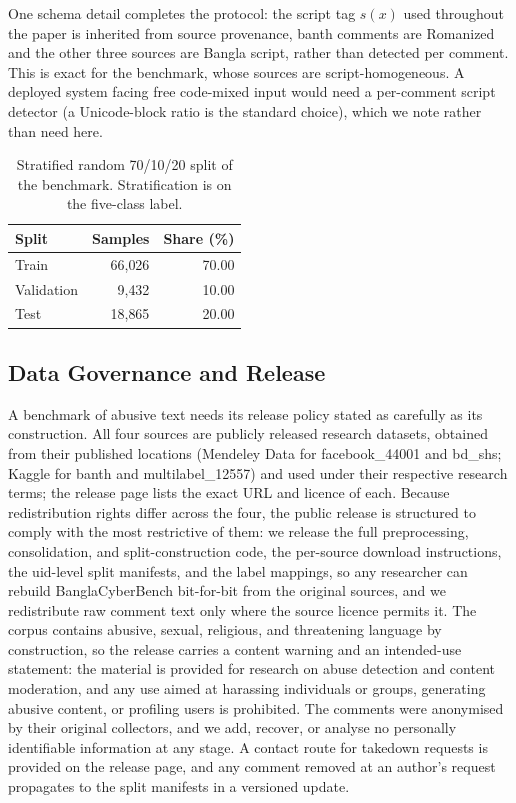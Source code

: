 \documentclass[11pt,a4paper]{article}
\def\dset#1{#1}%
\def\texttt#1{#1}%
\def\textsc#1{#1}%
\providecommand{\dset}[1]{\textsc{#1}}
\newcommand{\bench}{BanglaCyberBench}
\begin{document}
One schema detail completes the protocol: the script tag $s(x)$ used throughout the paper is inherited from source provenance, \dset{banth} comments are Romanized and the other three sources are Bangla script, rather than detected per comment. This is exact for the benchmark, whose sources are script-homogeneous. A deployed system facing free code-mixed input would need a per-comment script detector (a Unicode-block ratio is the standard choice), which we note rather than need here.

\begin{table}[!htbp]
\centering
\caption{Stratified random 70/10/20 split of the benchmark. Stratification is on the five-class label.}
\label{tab:split}
\small
\begin{tabular}{@{}lrr@{}}
\toprule
\textbf{Split} & \textbf{Samples} & \textbf{Share (\%)} \\
\midrule
Train & 66{,}026 & 70.00 \\
Validation & 9{,}432 & 10.00 \\
Test & 18{,}865 & 20.00 \\
\bottomrule
\end{tabular}
\end{table}

\subsection{Data Governance and Release}
\label{sec:governance}

A benchmark of abusive text needs its release policy stated as carefully as its construction. All four sources are publicly released research datasets, obtained from their published locations (Mendeley Data for \dset{facebook\_44001} and \dset{bd\_shs}; Kaggle for \dset{banth} and \dset{multilabel\_12557}) and used under their respective research terms; the release page lists the exact URL and licence of each. Because redistribution rights differ across the four, the public release is structured to comply with the most restrictive of them: we release the full preprocessing, consolidation, and split-construction code, the per-source download instructions, the \texttt{uid}-level split manifests, and the label mappings, so any researcher can rebuild \bench{} bit-for-bit from the original sources, and we redistribute raw comment text only where the source licence permits it. The corpus contains abusive, sexual, religious, and threatening language by construction, so the release carries a content warning and an intended-use statement: the material is provided for research on abuse detection and content moderation, and any use aimed at harassing individuals or groups, generating abusive content, or profiling users is prohibited. The comments were anonymised by their original collectors, and we add, recover, or analyse no personally identifiable information at any stage. A contact route for takedown requests is provided on the release page, and any comment removed at an author's request propagates to the split manifests in a versioned update.
\end{document}
